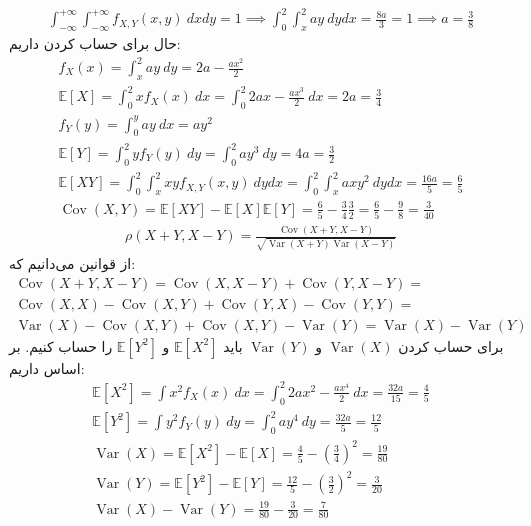 \\
\begin{gather*}
    \int_{-\infty}^{+\infty} \int_{-\infty}^{+\infty} f_{X,Y}(x,y) ~ dx dy = 1 \implies
    \int_{0}^{2} \int_{x}^{2} ay ~ dy dx = \frac{8a}{3} = 1 \implies a = \frac{3}{8}
\end{gather*}
حال برای حساب کردن
داریم:
\begin{gather*}
    f_X(x) = \int_{x}^{2} ay ~ dy = 2a - \frac{ax^2}{2}\\
    \mathbb{E} [X] = \int_0^2 x f_X(x) ~ dx = \int_0^2 2ax - \frac{ax^3}{2} ~ dx = 2a = \frac{3}{4}\\
    f_Y(y) = \int_{0}^{y} ay ~ dx = ay^2\\
    \mathbb{E} [Y] = \int_0^2 y f_Y(y) ~ dy = \int_0^2 ay^3 ~ dy = 4a = \frac{3}{2}\\
    \mathbb{E} [XY] = \int_{0}^{2} \int_{x}^{2} xy f_{X,Y}(x,y) ~ dydx =
    \int_{0}^{2} \int_{x}^{2} axy^2 ~ dydx = \frac{16a}{5} = \frac{6}{5}\\
    \operatorname{Cov}(X,Y) = \mathbb{E} [XY] - \mathbb{E} [X] \mathbb{E} [Y] = \frac{6}{5} - \frac{3}{4} \frac{3}{2} = 
    \frac{6}{5} - \frac{9}{8} = \frac{3}{40}
\end{gather*}
\begin{gather*}
    \rho (X + Y, X - Y) = \frac{\operatorname{Cov}(X+Y,X-Y)}{\sqrt{\operatorname{Var}(X+Y) \operatorname{Var}(X-Y)}}
\end{gather*}
از قوانین
می‌دانیم که:
\begin{gather*}
    \operatorname{Cov}(X+Y,X-Y) = \operatorname{Cov}(X,X-Y) + \operatorname{Cov}(Y,X-Y) =\\
    \operatorname{Cov}(X,X) - \operatorname{Cov}(X,Y) + \operatorname{Cov}(Y,X) - \operatorname{Cov}(Y,Y) =\\
    \operatorname{Var}(X) - \operatorname{Cov}(X,Y) + \operatorname{Cov}(X,Y) - \operatorname{Var}(Y) = \operatorname{Var}(X) - \operatorname{Var}(Y)
\end{gather*}
برای حساب کردن
$\operatorname{Var}(X)$ و $\operatorname{Var}(Y)$
باید
$\mathbb{E} [X^2]$ و $\mathbb{E} [Y^2]$
را حساب کنیم. بر اساس
داریم:
\begin{gather*}
    \mathbb{E} [X^2] = \int x^2 f_X(x) ~ dx = \int_0^2 2ax^2 - \frac{ax^4}{2} ~ dx = \frac{32a}{15} = \frac{4}{5}\\
    \mathbb{E} [Y^2] = \int y^2 f_Y(y) ~ dy = \int_0^2 ay^4 ~ dy = \frac{32a}{5} = \frac{12}{5}\\
    \operatorname{Var}(X) = \mathbb{E} [X^2] - \mathbb{E} [X] = \frac{4}{5} - (\frac{3}{4})^2 = \frac{19}{80}\\
    \operatorname{Var}(Y) = \mathbb{E} [Y^2] - \mathbb{E} [Y] = \frac{12}{5} - (\frac{3}{2})^2 = \frac{3}{20}\\
    \operatorname{Var}(X) - \operatorname{Var}(Y) = \frac{19}{80} - \frac{3}{20} = \frac{7}{80}
\end{gather*}
